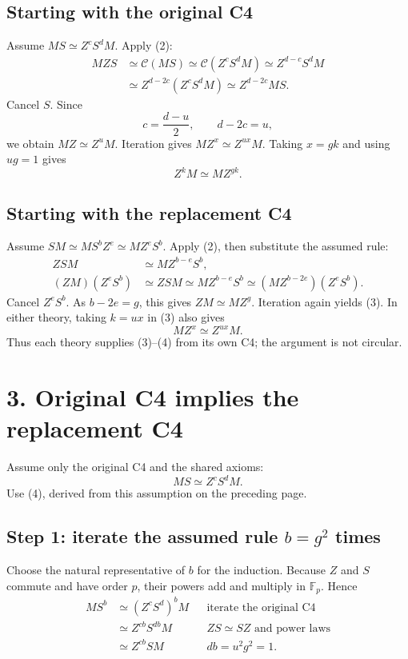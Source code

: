 \documentclass[11pt,a4paper]{article}
\newcommand{\F}{\mathbb F_p}
\newcommand{\eqw}{\mathrel{\simeq}}
\newcommand{\CC}{\mathcal C}
\newcommand{\heading}[1]{\section*{\textcolor{ink}{#1}}}
\begin{document}
\subsection*{Starting with the original C4}
Assume $MS\eqw Z^cS^dM$. Apply (2):
\begin{align*}
 MZS
 &\eqw \CC(MS)
 \eqw \CC(Z^cS^dM)
 \eqw Z^{d-c}S^dM\\
 &\eqw Z^{d-2c}(Z^cS^dM)
 \eqw Z^{d-2c}MS.
\end{align*}
Cancel $S$. Since
\[
 c=\frac{d-u}{2},\qquad d-2c=u,
\]
we obtain $MZ\eqw Z^uM$. Iteration gives
$MZ^x\eqw Z^{ux}M$. Taking $x=gk$ and using $ug=1$ gives
\[
 \boxed{Z^kM\eqw MZ^{gk}}.
 \tag{3}
\]

\subsection*{Starting with the replacement C4}
Assume $SM\eqw MS^bZ^e\eqw MZ^eS^b$.
Apply (2), then substitute the assumed rule:
\begin{align*}
 ZSM&\eqw MZ^{b-e}S^b,\\
 (ZM)(Z^eS^b)
 &\eqw ZSM
 \eqw MZ^{b-e}S^b
 \eqw (MZ^{b-2e})(Z^eS^b).
\end{align*}
Cancel $Z^eS^b$. As $b-2e=g$, this gives $ZM\eqw MZ^g$.
Iteration again yields (3). In either theory, taking $k=ux$ in (3) also gives
\[
 \boxed{MZ^x\eqw Z^{ux}M}.
 \tag{4}
\]
Thus each theory supplies (3)--(4) from its own C4; the argument is not circular.

\newpage
\heading{3. Original C4 implies the replacement C4}
Assume only the original C4 and the shared axioms:
\[
 MS\eqw Z^cS^dM.
\]
Use (4), derived from this assumption on the preceding page.

\subsection*{Step 1: iterate the assumed rule $b=g^2$ times}
Choose the natural representative of $b$ for the induction. Because $Z$ and
$S$ commute and have order $p$, their powers add and multiply in $\F$.
Hence
\begin{align*}
 MS^b
 &\eqw (Z^cS^d)^bM
 &&\text{iterate the original C4}\\
 &\eqw Z^{cb}S^{db}M
 &&\text{$ZS\eqw SZ$ and power laws}\\
 &\eqw Z^{cb}SM
 &&\text{$db=u^2g^2=1$.}
\end{align*}
\end{document}
